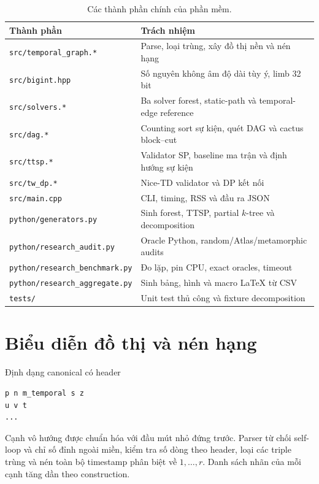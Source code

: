 \begin{table}[htbp]
\centering
\small
\caption{Các thành phần chính của phần mềm.}
\label{tab:architecture}
\begin{tabularx}{\textwidth}{>{\raggedright\arraybackslash}p{5.2cm}X}
\toprule
Thành phần & Trách nhiệm \\
\midrule
\nolinkurl{src/temporal_graph.*} & Parse, loại trùng, xây đồ thị nền và nén hạng \\
\nolinkurl{src/bigint.hpp} & Số nguyên không âm độ dài tùy ý, limb 32 bit \\
\nolinkurl{src/solvers.*} & Ba solver forest, static-path và temporal-edge reference \\
\nolinkurl{src/dag.*} & Counting sort sự kiện, quét DAG và cactus block--cut \\
\nolinkurl{src/ttsp.*} & Validator SP, baseline ma trận và định hướng sự kiện \\
\nolinkurl{src/tw_dp.*} & Nice-TD validator và DP kết nối \\
\nolinkurl{src/main.cpp} & CLI, timing, RSS và đầu ra JSON \\
\nolinkurl{python/generators.py} & Sinh forest, TTSP, partial $k$-tree và decomposition \\
\nolinkurl{python/research_audit.py} & Oracle Python, random/Atlas/metamorphic audits \\
\nolinkurl{python/research_benchmark.py} & Đo lặp, pin CPU, exact oracles, timeout \\
\nolinkurl{python/research_aggregate.py} & Sinh bảng, hình và macro LaTeX từ CSV \\
\nolinkurl{tests/} & Unit test thủ công và fixture decomposition \\
\bottomrule
\end{tabularx}
\end{table}

\section{Biểu diễn đồ thị và nén hạng}

Định dạng canonical có header
\begin{lstlisting}[numbers=none]
p n m_temporal s z
u v t
...
\end{lstlisting}
Cạnh vô hướng được chuẩn hóa với đầu mút nhỏ đứng trước. Parser từ chối self-loop và chỉ số đỉnh ngoài miền, kiểm tra số dòng theo header, loại các triple trùng và nén toàn bộ timestamp phân biệt về $1,\ldots,r$. Danh sách nhãn của mỗi cạnh tăng dần theo construction.

